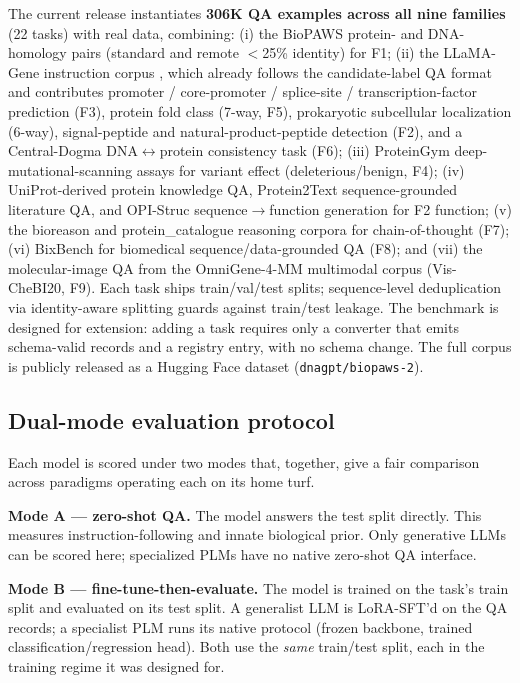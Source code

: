 The current release instantiates \textbf{306K QA examples across all nine families} (22
tasks) with real data, combining: (i) the BioPAWS protein- and DNA-homology pairs (standard
and remote $<$25\% identity) for F1; (ii) the LLaMA-Gene instruction corpus
\citep{wang2024llamagene}, which already follows the candidate-label QA format and
contributes promoter / core-promoter / splice-site / transcription-factor prediction (F3),
protein fold class (7-way, F5), prokaryotic subcellular localization (6-way),
signal-peptide and natural-product-peptide detection (F2), and a Central-Dogma
DNA$\leftrightarrow$protein consistency task (F6); (iii) ProteinGym \citep{notin2023proteingym}
deep-mutational-scanning assays for variant effect (deleterious/benign, F4); (iv)
UniProt-derived protein knowledge QA, Protein2Text sequence-grounded literature QA, and
OPI-Struc sequence$\rightarrow$function generation for F2 function; (v) the bioreason and
protein\_catalogue reasoning corpora for chain-of-thought (F7); (vi) BixBench
\citep{bixbench2024} for biomedical sequence/data-grounded QA (F8); and (vii) the
molecular-image QA from the OmniGene-4-MM multimodal corpus (Vis-CheBI20, F9). Each task
ships train/val/test splits; sequence-level deduplication via identity-aware splitting
guards against train/test leakage. The benchmark is designed for extension: adding a task
requires only a converter that emits schema-valid records and a registry entry, with no
schema change. The full corpus is publicly released as a Hugging Face dataset
(\texttt{dnagpt/biopaws-2}).

\subsection{Dual-mode evaluation protocol}
\label{sec:biopaws2_protocol}

Each model is scored under two modes that, together, give a fair comparison across
paradigms operating each on its home turf.

\textbf{Mode A --- zero-shot QA.} The model answers the test split directly. This measures
instruction-following and innate biological prior. Only generative LLMs can be scored here;
specialized PLMs have no native zero-shot QA interface.

\textbf{Mode B --- fine-tune-then-evaluate.} The model is trained on the task's train split
and evaluated on its test split. A generalist LLM is LoRA-SFT'd on the QA records; a
specialist PLM runs its native protocol (frozen backbone, trained classification/regression
head). Both use the \emph{same} train/test split, each in the training regime it was
designed for.

